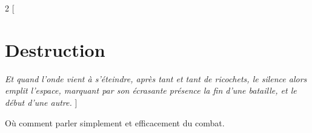 \documentclass[11pt,oneside]{book}
\begin{document}
\begin{multicols}{2}
    [
        \chapter{Destruction}
        \linebreak
        \emph{Et quand l'onde vient à s'éteindre, après tant et tant de ricochets, le silence alors emplit l'espace, marquant par son écrasante présence la fin d'une bataille, et le début d'une autre.}
    ]


    Où comment parler simplement et efficacement du combat.






\end{multicols}
\end{document}
